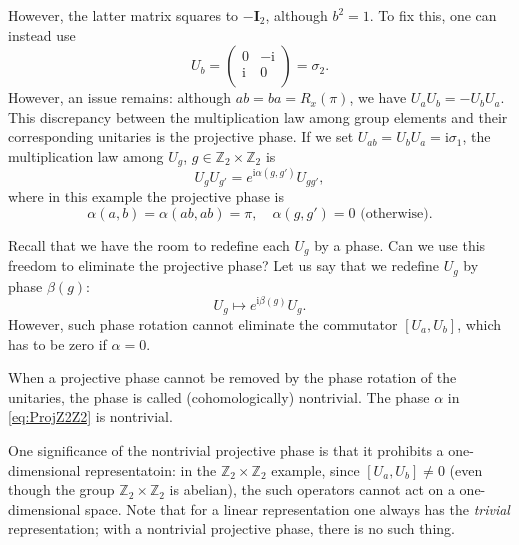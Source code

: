 \documentclass[
]{scrartcl}
\numberwithin{equation}{section}
\theoremstyle{definition}
\theoremstyle{definition}
\theoremstyle{definition}
\theoremstyle{definition}
\theoremstyle{remark}
\begin{document}
However, the latter matrix squares to \(-\mathbf{I}_2\), although \(b^2=1\).
To fix this, one can instead use
\begin{equation}
  \label{eq:UbZ2Z2}
  U_b = 
  \begin{pmatrix}
    0 & -\mathrm{i} \\
    \mathrm{i} & 0 \\
  \end{pmatrix} =\sigma_2.
\end{equation}
However, an issue remains: although \(ab = ba = R_x(\pi)\), we have \(U_a U_b = - U_b U_a\).
This discrepancy between the multiplication law among group elements and their corresponding unitaries is the projective phase.
If we set \(U_{ab} = U_b U_a = \mathrm{i}\sigma _1\), the multiplication law among \(U_g\), \(g\in \mathbb{Z}_2\times\mathbb{Z}_2\) is
\begin{equation}
  \label{eq:ProjRep}
  U_g U_{g'} = e^{\mathrm{i}\alpha(g,g')}U_{gg'},
\end{equation}
where in this example the projective phase is
\begin{equation}
  \label{eq:ProjZ2Z2}
    \alpha(a,b) = \alpha(ab,ab) = \pi,\quad
    \alpha(g,g') = 0 \,\, \text{(otherwise)}.
\end{equation}

Recall that we have the room to redefine each \(U_g\) by a phase. Can we use this freedom to eliminate the projective phase?
Let us say that we redefine \(U_g\) by phase \(\beta(g)\):
\begin{equation}
  \label{eq:Uredef}
  U_g \mapsto e^{\mathrm{i}\beta(g)}U_g.
\end{equation}
However, such phase rotation cannot eliminate the commutator \([U_a,U_b]\), which has to be zero if \(\alpha = 0\).

When a projective phase cannot be removed by the phase rotation of the unitaries, the phase is called (cohomologically) nontrivial. The phase \(\alpha\) in \eqref{eq:ProjZ2Z2} is nontrivial.

One significance of the nontrivial projective phase is that it prohibits a one-dimensional representatoin: in the \(\mathbb{Z}_2\times\mathbb{Z}_2\) example, since \([U_a,U_b]\neq 0\) (even though the group \(\mathbb{Z}_2\times \mathbb{Z}_2\) is abelian), the such operators cannot act on a one-dimensional space. Note that for a linear representation one always has the \emph{trivial} representation; with a nontrivial projective phase, there is no such thing.
\end{document}
